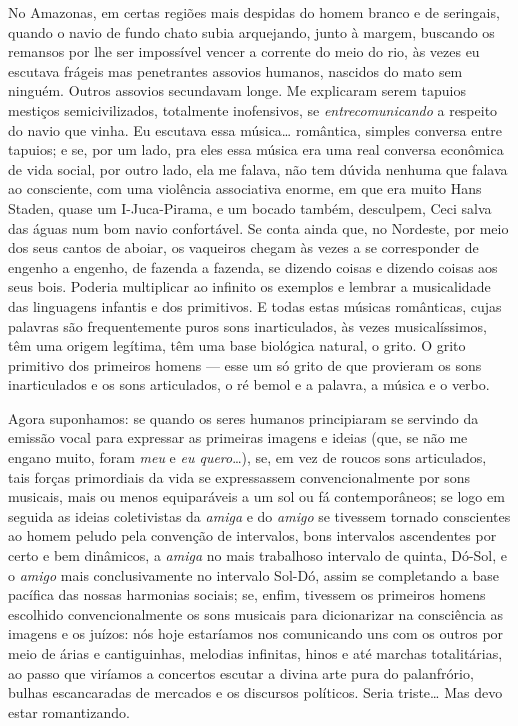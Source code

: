 No Amazonas, em certas regiões mais despidas do homem branco e de
seringais, quando o navio de fundo chato subia arquejando, junto à
margem, buscando os remansos por lhe ser impossível vencer a corrente do
meio do rio, às vezes eu escutava frágeis mas penetrantes assovios
humanos, nascidos do mato sem ninguém. Outros assovios secundavam longe.
Me explicaram serem tapuios mestiços semicivilizados, totalmente
inofensivos, se \textit{entrecomunicando} a respeito do navio que vinha. Eu
escutava essa música\ldots{} romântica, simples conversa entre tapuios; e se,
por um lado, pra eles essa música era uma real conversa econômica de
vida social, por outro lado, ela me falava, não tem dúvida nenhuma que
falava ao consciente, com uma violência associativa enorme, em que era
muito Hans Staden, quase um I-Juca-Pirama, e um bocado também,
desculpem, Ceci salva das águas num bom navio confortável. Se conta
ainda que, no Nordeste, por meio dos seus cantos de aboiar, os vaqueiros
chegam às vezes a se corresponder de engenho a engenho, de fazenda a
fazenda, se dizendo coisas e dizendo coisas aos seus bois. Poderia
multiplicar ao infinito os exemplos e lembrar a musicalidade das
linguagens infantis e dos primitivos. E todas estas músicas românticas,
cujas palavras são frequentemente puros sons inarticulados, às vezes
musicalíssimos, têm uma origem legítima, têm uma base biológica natural,
o grito. O grito primitivo dos primeiros homens --- esse um só grito de
que provieram os sons inarticulados e os sons articulados, o ré bemol e
a palavra, a música e o verbo.

Agora suponhamos: se quando os seres humanos principiaram se servindo da
emissão vocal para expressar as primeiras imagens e ideias (que, se não
me engano muito, foram \textit{meu} e \textit{eu quero}\ldots{}), se, em vez de roucos
sons articulados, tais forças primordiais da vida se expressassem
convencionalmente por sons musicais, mais ou menos equiparáveis a um sol
ou fá contemporâneos; se logo em seguida as ideias coletivistas da
\textit{amiga} e do \textit{amigo} se tivessem tornado conscientes ao homem peludo
pela convenção de intervalos, bons intervalos ascendentes por certo e
bem dinâmicos, a \textit{amiga} no mais trabalhoso intervalo de quinta,
Dó-Sol, e o \textit{amigo} mais conclusivamente no intervalo Sol-Dó, assim se
completando a base pacífica das nossas harmonias sociais; se, enfim,
tivessem os primeiros homens escolhido convencionalmente os sons
musicais para dicionarizar na consciência as imagens e os juízos: nós
hoje estaríamos nos comunicando uns com os outros por meio de árias e
cantiguinhas, melodias infinitas, hinos e até marchas totalitárias, ao
passo que viríamos a concertos escutar a divina arte pura do
palanfrório, bulhas escancaradas de mercados e os discursos políticos.
Seria triste\ldots{} Mas devo estar romantizando.

